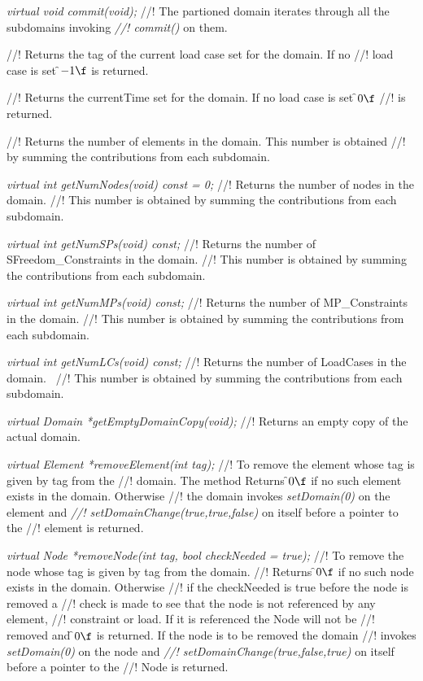 {\em virtual void commit(void);}
//! The partioned domain iterates through all the subdomains invoking {\em
//! commit()} on them.

//! Returns the tag of the current load case set for the domain. If no
//! load case is set \f$-1\f$ is returned.

//! Returns the currentTime set for the domain. If no load case is set \f$0\f$
//! is returned. 

//! Returns the number of elements in the domain. This number is obtained
//! by summing the contributions from each subdomain.

{\em virtual int getNumNodes(void) const = 0;}
//! Returns the number of nodes in the domain.
//! This number is obtained by summing the contributions from each subdomain.

{\em virtual int getNumSPs(void) const;}
//! Returns the number of SFreedom\_Constraints in the domain. 
//! This number is obtained by summing the contributions from each subdomain.

{\em virtual int getNumMPs(void) const;}
//! Returns the number of MP\_Constraints in the domain. 
//! This number is obtained by summing the contributions from each subdomain.

{\em virtual int getNumLCs(void) const;}    
//! Returns the number of LoadCases in the domain. \
//! This number is obtained by summing the contributions from each subdomain.

{\em virtual Domain *getEmptyDomainCopy(void);}
//! Returns an empty copy of the actual domain.

{\em virtual Element *removeElement(int tag);}
//! To remove the element whose tag is given by \p tag from the
//! domain. The method Returns \f$0\f$ if no such element exists in the domain. Otherwise 
//! the domain invokes {\em setDomain(0)} on the element and {\em
//! setDomainChange(true,true,false)} on itself before a pointer to the
//! element is returned.

{\em virtual Node *removeNode(int tag, bool checkNeeded = true);}    
//! To remove the node whose tag is given by \p tag from the domain. 
//! Returns \f$0\f$ if no such node exists in the domain. Otherwise
//! if the \p checkNeeded is \p true before the node is removed a
//! check is made to see that the node is not referenced by any element,
//! constraint or load. If it is referenced the Node will not be
//! removed and \f$0\f$ is returned. If the node is to be removed the domain
//! invokes {\em setDomain(0)} on the node and {\em
//! setDomainChange(true,false,true)} on itself before a pointer to the
//! Node is returned.

